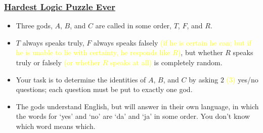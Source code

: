 \documentclass[UTF8,11pt,colorlinks,compress,openany]{beamer}%
\begin{document}
\begin{frame}\frametitle{\href{https://mp.weixin.qq.com/s/CEtNyU3OMChVg5vMX5fnLA}{Hardest Logic Puzzle Ever}}
	\begin{problem}
		\begin{itemize}
			\item Three gods, $A$, $B$, and $C$ are called in some order, $T$, $F$, and $R$.
			\item $T$ always speaks truly, $F$ always speaks falsely \textcolor{yellow}{(if he is certain he can; but if he is unable to lie with certainty, he responds like $R$)}, but whether $R$ speaks truly or falsely \textcolor{yellow}{(or whether $R$ speaks at all)} is completely random.
			\item Your task is to determine the identities of $A$, $B$, and $C$ by asking $2$ \textcolor{yellow}{($3$)} yes/no questions; each question must be put to exactly one god.
			\item The gods understand English, but will answer in their own language, in which the words for `yes' and `no' are `da' and `ja' in some order. You don't know which word means which.
		\end{itemize}
	\end{problem}
\end{frame}
\end{document}
